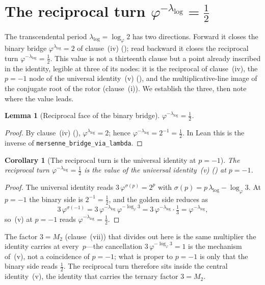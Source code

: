 \documentclass[11pt]{amsart}
\newtheorem{Lemma}[Theorem]{Lemma}
\newtheorem{Corollary}[Theorem]{Corollary}
\theoremstyle{definition}
\newcommand{\golden}{\varphi}
\newcommand{\lean}[1]{\texttt{#1}}
\begin{document}
\section{\texorpdfstring{The reciprocal turn $\golden^{-\lambda_{\log}}=\tfrac12$}{The reciprocal turn}}
\label{sec:spectral}

The transcendental period $\lambda_{\log}=\log_{\golden}2$ has two
directions.  Forward it closes the binary bridge
$\golden^{\lambda_{\log}}=2$ of clause~(iv) (); read
backward it closes the reciprocal turn
$\golden^{-\lambda_{\log}}=\tfrac12$.  This value is not a thirteenth
clause but a point already inscribed in the identity, legible at three
of its nodes: it is the reciprocal of clause~(iv), the $p=-1$ node of
the universal identity~(v) (), and the
multiplicative-line image of the conjugate root of the rotor
(clause~(i)).  We establish the three, then note where the value leads.

\begin{Lemma}[Reciprocal face of the binary bridge]\label{lem:inverse-turn}
$\golden^{-\lambda_{\log}}=\tfrac12$.
\end{Lemma}

\begin{proof}
By clause~(iv) (), $\golden^{\lambda_{\log}}=2$; hence
$\golden^{-\lambda_{\log}}=2^{-1}=\tfrac12$.  In Lean this is the inverse
of \lean{mersenne\_bridge\_via\_lambda}.
\end{proof}

\begin{Corollary}[The reciprocal turn is the universal identity at $p=-1$]\label{cor:reciprocal-node}
The reciprocal turn $\golden^{-\lambda_{\log}}=\tfrac12$ is the value of
the universal identity~(v) () at $p=-1$.
\end{Corollary}

\begin{proof}
The universal identity reads $3\,\golden^{\sigma(p)}=2^{p}$ with
$\sigma(p)=p\,\lambda_{\log}-\log_{\golden}3$.  At $p=-1$ the binary side
is $2^{-1}=\tfrac12$, and the golden side reduces as
\[
  3\,\golden^{\sigma(-1)}
    =3\,\golden^{-\lambda_{\log}}\,\golden^{-\log_{\golden}3}
    =3\,\golden^{-\lambda_{\log}}\cdot\tfrac13
    =\golden^{-\lambda_{\log}},
\]
so~(v) at $p=-1$ reads $\golden^{-\lambda_{\log}}=\tfrac12$.
\end{proof}

The factor $3=M_{2}$ (clause~(vii)) that divides out here is the same
multiplier the identity carries at every~$p$---the cancellation
$3\,\golden^{-\log_{\golden}3}=1$ is the mechanism of~(v), not a
coincidence of $p=-1$; what is proper to $p=-1$ is only that the binary
side reads $\tfrac12$.  The reciprocal turn therefore sits inside the
central identity~(v), the identity that carries the ternary factor
$3=M_{2}$.
\end{document}
